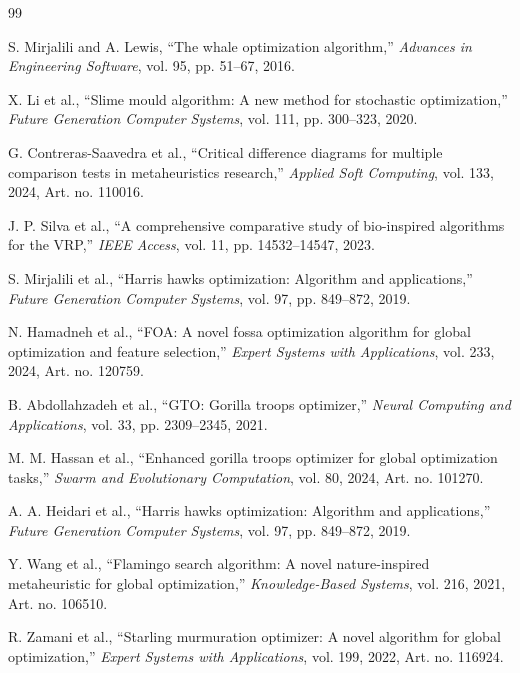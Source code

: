 \documentclass[10pt,a4paper]{extarticle}
\begin{document}
{\clearpage
\begin{thebibliography}{99}

 S. Mirjalili and A. Lewis, ``The whale optimization algorithm,'' \textit{Advances in Engineering Software}, vol. 95, pp. 51--67, 2016.

 X. Li et al., ``Slime mould algorithm: A new method for stochastic optimization,'' \textit{Future Generation Computer Systems}, vol. 111, pp. 300--323, 2020.

 G. Contreras-Saavedra et al., ``Critical difference diagrams for multiple comparison tests in metaheuristics research,'' \textit{Applied Soft Computing}, vol. 133, 2024, Art. no. 110016.

 J. P. Silva et al., ``A comprehensive comparative study of bio-inspired algorithms for the VRP,'' \textit{IEEE Access}, vol. 11, pp. 14532--14547, 2023.

 S. Mirjalili et al., ``Harris hawks optimization: Algorithm and applications,'' \textit{Future Generation Computer Systems}, vol. 97, pp. 849--872, 2019.

 N. Hamadneh et al., ``FOA: A novel fossa optimization algorithm for global optimization and feature selection,'' \textit{Expert Systems with Applications}, vol. 233, 2024, Art. no. 120759.

 B. Abdollahzadeh et al., ``GTO: Gorilla troops optimizer,'' \textit{Neural Computing and Applications}, vol. 33, pp. 2309--2345, 2021.

 M. M. Hassan et al., ``Enhanced gorilla troops optimizer for global optimization tasks,'' \textit{Swarm and Evolutionary Computation}, vol. 80, 2024, Art. no. 101270.

 A. A. Heidari et al., ``Harris hawks optimization: Algorithm and applications,'' \textit{Future Generation Computer Systems}, vol. 97, pp. 849--872, 2019.

 Y. Wang et al., ``Flamingo search algorithm: A novel nature-inspired metaheuristic for global optimization,'' \textit{Knowledge-Based Systems}, vol. 216, 2021, Art. no. 106510.

 R. Zamani et al., ``Starling murmuration optimizer: A novel algorithm for global optimization,'' \textit{Expert Systems with Applications}, vol. 199, 2022, Art. no. 116924.


\end{thebibliography}}
\end{document}
